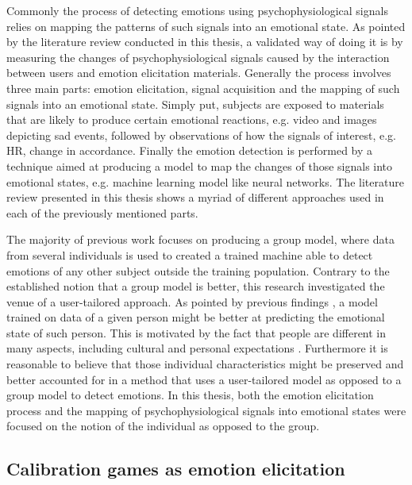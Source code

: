 Commonly the process of detecting emotions using psychophysiological signals relies on mapping the patterns of such signals into an emotional state. As pointed by the literature review conducted in this thesis, a validated way of doing it is by measuring the changes of psychophysiological signals caused by the interaction between users and emotion elicitation materials. Generally the process involves three main parts: emotion elicitation, signal acquisition and the mapping of such signals into an emotional state. Simply put, subjects are exposed to materials that are likely to produce certain emotional reactions, e.g. video and images depicting sad events, followed by observations of how the signals of interest, e.g. HR, change in accordance. Finally the emotion detection is performed by a technique aimed at producing a model to map the changes of those signals into emotional states, e.g. machine learning model like neural networks. The literature review presented in this thesis shows a myriad of different approaches used in each of the previously mentioned parts.

The majority of previous work focuses on producing a group model, where data from several individuals is used to created a trained machine able to detect emotions of any other subject outside the training population. Contrary to the established notion that a group model is better, this research investigated the venue of a user-tailored approach. As pointed by previous findings \parencite{something}, a model trained on data of a given person might be better at predicting the emotional state of such person. This is motivated by the fact that people are different in many aspects, including cultural and personal expectations \parencite{some}. Furthermore it is reasonable to believe that those individual characteristics might be preserved and better accounted for in a method that uses a user-tailored model as opposed to a group model to detect emotions. In this thesis, both the emotion elicitation process and the mapping of psychophysiological signals into emotional states were focused on the notion of the individual as opposed to the group.

\subsection{Calibration games as emotion elicitation}


